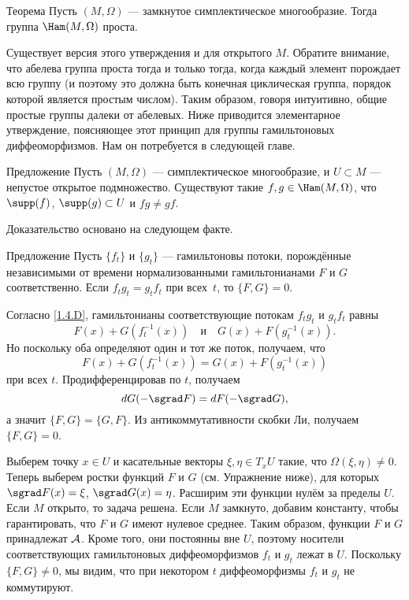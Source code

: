 \begin{thm}{Теорема}\label{1.5.A}
Пусть $(M, \Omega)$ --- замкнутое симплектическое многообразие.
Тогда группа $\Ham (M, \Omega)$ проста.
\end{thm}

Существует версия этого утверждения и для открытого $M$.
Обратите внимание, что абелева группа проста тогда и только тогда, когда каждый элемент порождает всю группу (и поэтому это должна быть конечная циклическая группа, порядок которой является простым числом).
Таким образом, говоря интуитивно, общие простые группы далеки от абелевых.
Ниже приводится элементарное утверждение, поясняющее этот принцип для группы гамильтоновых диффеоморфизмов.
Нам он потребуется в следующей главе.

\begin{thm}{Предложение}\label{1.5.B}
Пусть $(M, \Omega)$ --- симплектическое многообразие, и $U \subset M$ --- непустое открытое подмножество.
Существуют такие $f, g \in \Ham (M, \Omega)$, что $\supp (f)$, $\supp (g) \subset U$ и $f g \ne gf$.
\end{thm}

Доказательство основано на следующем факте.

\begin{thm}{Предложение}\label{1.5.C}
Пусть $\{f_t\}$ и $\{g_t\}$ --- гамильтоновы потоки, порождённые независимыми от времени нормализованными гамильтонианами $F$ и $G$ соответственно.
Если $f_t g_t = g_t f_t$ при всех~$t$, то $\{F, G\} = 0$.
\end{thm}

Согласно \ref{1.4.D}, гамильтонианы соответствующие потокам $f_t g_t$ и $g_t f_t$ равны
\[F(x)+G(f_t^{-1} (x))
\quad\text{и}\quad
G (x) + F (g_t^{-1}(x)).
\]
Но поскольку оба определяют один и тот же поток, получаем, что 
\[F (x) + G (f_t^{-1} (x)) = G (x) + F (g_t^{-1} (x))\]
при всех $t$.
Продифференцировав по $t$, получаем
\[\d G(-\sgrad F)=\d F(-\sgrad G),\]
а значит $\{F, G\} = \{G, F\}$.
Из антикоммутативности скобки Ли, получаем $\{F, G\} = 0$.

Выберем точку $x\in U$ и касательные векторы $\xi, \eta \in T_x U$ такие, что $\Omega (\xi, \eta) \ne 0$.
Теперь выберем ростки функций $F$ и $G$ (см. Упражнение ниже), для которых $\sgrad F (x) = \xi$, $\sgrad G (x) = \eta$.
Расширим эти функции нулём за пределы $U$.
Если $M$ открыто, то задача решена.
Если $M$ замкнуто, добавим константу, чтобы гарантировать, что $F$ и $G$ имеют нулевое среднее.
Таким образом, функции $F$ и $G$ принадлежат $\mathcal{A}$.
Кроме того, они постоянны вне $U$, поэтому носители соответствующих гамильтоновых диффеоморфизмов $f_t$ и $g_t$ лежат в $U$.
Поскольку $\{F, G\} \ne 0$, мы видим, что при некотором $t$ диффеоморфизмы $f_t$ и $g_t$ не коммутируют.

